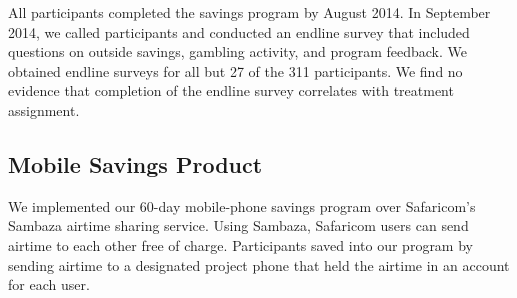 \documentclass[11pt]{article}
\begin{document}
		All participants completed the savings program by August 2014. In September 2014, we called participants and conducted an endline survey that included questions on outside savings, gambling activity, and program feedback. We obtained endline surveys for all but 27 of the 311 participants. We find no evidence that completion of the endline survey correlates with treatment assignment.

		\clearpage

	\subsection{Mobile Savings Product}

		We implemented our 60-day mobile-phone savings program over Safaricom's Sambaza airtime sharing service. Using Sambaza, Safaricom users can send airtime to each other free of charge. Participants saved into our program by sending airtime to a designated project phone that held the airtime in an account for each user.



\end{document}
